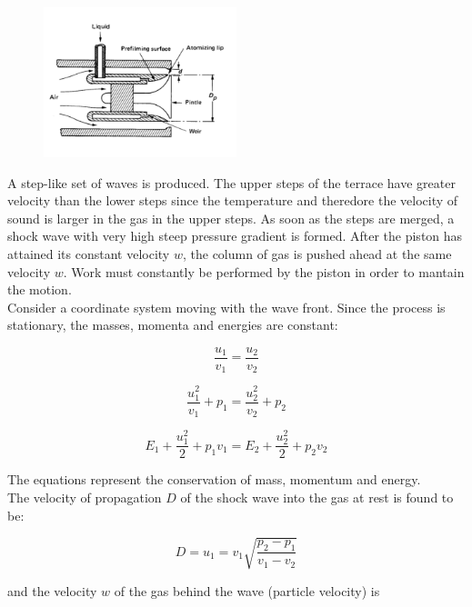 \documentclass[12pt]{article}
\begin{document}
\begin{figure}[h!]
\centering
\includegraphics[width=0.5\textwidth]{figures/airblast.png}
\end{figure}

A step-like set of waves is produced. The upper steps of the terrace have greater velocity than the lower steps since the temperature and theredore the velocity of sound is larger in the gas in the upper steps. As soon as the steps are merged, a shock wave with very high steep pressure gradient is formed. After the piston has attained its constant velocity $w$, the column of gas is pushed ahead at the same velocity $w$. Work must constantly be performed by the piston in order to mantain the motion.\\
Consider a coordinate system moving with the wave front. Since the process is stationary, the masses, momenta and energies are constant:

\begin{equation}
    \frac{u_{1}}{v_{1}} =  \frac{u_{2}}{v_{2}}
\end{equation}

\begin{equation}
    \frac{u_{1}^{2}}{v_{1}} + p_{1} =  \frac{u_{2}^{2}}{v_{2}} + p_{2}
\end{equation}

\begin{equation}
    E_{1} + \frac{u_{1}^{2}}{2} + p_{1}v_{1} = E_{2} + \frac{u_{2}^{2}}{2} + p_{2}v_{2}
\end{equation}

The equations represent the conservation of mass, momentum and energy.\\
The velocity of propagation $D$ of the shock wave into the gas at rest is found to be:

\begin{equation}
    D = u_{1} = v_{1}\sqrt{\frac{p_{2}-p_{1}}{v_{1}-v_{2}}}
\end{equation}

and the velocity $w$ of the gas behind the wave (particle velocity) is
\end{document}
